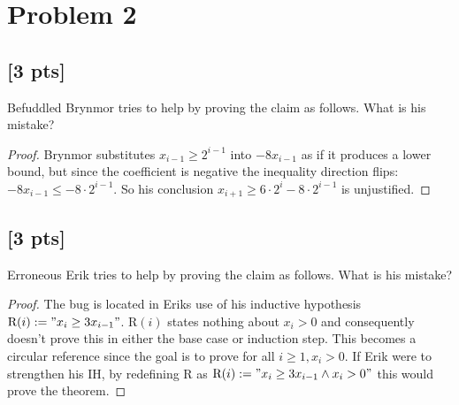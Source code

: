 \documentclass[11pt]{article}
\theoremstyle{definition}
\begin{document}
\vspace{1cm}

\section*{Problem 2}
\setcounter{subsection}{0}

\subsection{[3 pts]} Befuddled Brynmor tries to help by proving the claim as follows. What is his mistake?
\begin{proof}
	Brynmor substitutes $x_{i-1} \geq 2^{i-1}$ into $-8 x_{i-1}$ as if it produces a lower bound, but since the coefficient is negative the inequality direction flips: $-8 x_{i-1} \leq -8 \cdot 2^{i-1}$. So his conclusion $x_{i+1} \geq 6 \cdot 2^i - 8 \cdot 2^{i-1}$ is unjustified.
\end{proof}
\vspace{1cm}

\vspace{1cm}

\subsection{[3 pts]} Erroneous Erik tries to help by proving the claim as follows. What is his mistake?

\begin{proof}
	The bug is located in Eriks use of his inductive hypothesis $\text{R}(i) := "x_i \geq 3x_{i-1}"$. $\text{R}(i)$ states
	nothing about $x_i > 0$ and consequently doesn't prove this in either the base case or induction step.
	This becomes a circular reference since the goal is to prove for all $i \geq 1, x_i > 0$. If Erik were to
	strengthen his IH, by redefining R as $\text{R}(i) := "x_i \geq 3x_{i-1} \wedge x_i > 0"$ this would prove the
	theorem.
\end{proof}
\end{document}
